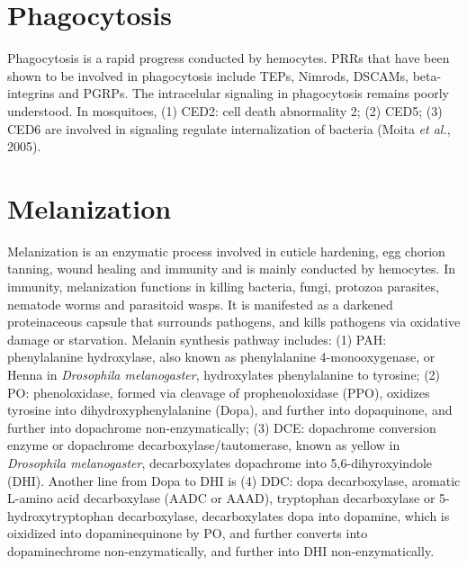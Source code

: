 \documentclass[11pt]{article}
\begin{document}
\begin{sloppypar}
\section*{Phagocytosis}
Phagocytosis is a rapid progress conducted by hemocytes. 
PRRs that have been shown to be involved in phagocytosis include TEPs, Nimrods, DSCAMs, beta-integrins and PGRPs. 
The intracelular signaling in phagocytosis remains poorly understood. 
In mosquitoes, 
\newline
(1) CED2: cell death abnormality 2; \newline
(2) CED5; \newline
(3) CED6 \newline 
are involved in signaling regulate internalization of bacteria (Moita \textit{et al.}, 2005). 

\section*{Melanization}
Melanization is an enzymatic process involved in cuticle hardening, egg chorion tanning, wound healing and immunity and is mainly conducted by hemocytes. 
In immunity, melanization functions in killing bacteria, fungi, protozoa parasites, nematode worms and parasitoid wasps. 
It is manifested as a darkened proteinaceous capsule that surrounds pathogens, and kills pathogens via oxidative damage or starvation. 
Melanin synthesis pathway includes: 
\newline
(1) PAH: phenylalanine hydroxylase, also known as phenylalanine 4-monooxygenase, or Henna in \textit{Drosophila melanogaster}, hydroxylates phenylalanine to tyrosine; \newline
(2) PO: phenoloxidase, formed via cleavage of prophenoloxidase (PPO), oxidizes tyrosine into dihydroxyphenylalanine (Dopa), and further into dopaquinone, and further into dopachrome non-enzymatically; \newline
(3) DCE: dopachrome conversion enzyme or dopachrome decarboxylase/tautomerase, known as yellow in \textit{Drosophila melanogaster}, decarboxylates dopachrome into 5,6-dihyroxyindole (DHI). \newline
Another line from Dopa to DHI is 
\newline
(4) DDC: dopa decarboxylase, aromatic L-amino acid decarboxylase (AADC or AAAD), tryptophan decarboxylase or 5-hydroxytryptophan decarboxylase, decarboxylates dopa into dopamine, which is oixidized into dopaminequinone by PO, and further converts into dopaminechrome non-enzymatically, and further into DHI non-enzymatically. \newline

\end{sloppypar}
\end{document}
